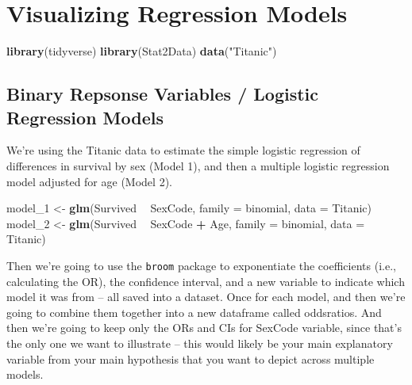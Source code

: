 \documentclass[]{article}
\newenvironment{Shaded}{\begin{snugshade}}{\end{snugshade}}
\newcommand{\DataTypeTok}[1]{\textcolor[rgb]{0.13,0.29,0.53}{#1}}
\newcommand{\DecValTok}[1]{\textcolor[rgb]{0.00,0.00,0.81}{#1}}
\newcommand{\KeywordTok}[1]{\textcolor[rgb]{0.13,0.29,0.53}{\textbf{#1}}}
\newcommand{\NormalTok}[1]{#1}
\newcommand{\OperatorTok}[1]{\textcolor[rgb]{0.81,0.36,0.00}{\textbf{#1}}}
\newcommand{\StringTok}[1]{\textcolor[rgb]{0.31,0.60,0.02}{#1}}
\begin{document}
\hypertarget{visualizing-regression-models}{%
\section{Visualizing Regression
Models}\label{visualizing-regression-models}}

\begin{Shaded}
\begin{Highlighting}[]
\KeywordTok{library}\NormalTok{(tidyverse)}
\KeywordTok{library}\NormalTok{(Stat2Data)}
\KeywordTok{data}\NormalTok{(}\StringTok{"Titanic"}\NormalTok{)}
\end{Highlighting}
\end{Shaded}

\hypertarget{binary-repsonse-variables-logistic-regression-models}{%
\subsection{Binary Repsonse Variables / Logistic Regression
Models}\label{binary-repsonse-variables-logistic-regression-models}}

We're using the Titanic data to estimate the simple logistic regression
of differences in survival by sex (Model 1), and then a multiple
logistic regression model adjusted for age (Model 2).

\begin{Shaded}
\begin{Highlighting}[]
\NormalTok{model_}\DecValTok{1}\NormalTok{ <-}\StringTok{ }\KeywordTok{glm}\NormalTok{(Survived }\OperatorTok{~}\StringTok{ }\NormalTok{SexCode, }\DataTypeTok{family =}\NormalTok{ binomial, }\DataTypeTok{data =}\NormalTok{ Titanic)}
\NormalTok{model_}\DecValTok{2}\NormalTok{ <-}\StringTok{ }\KeywordTok{glm}\NormalTok{(Survived }\OperatorTok{~}\StringTok{ }\NormalTok{SexCode }\OperatorTok{+}\StringTok{ }\NormalTok{Age, }\DataTypeTok{family =}\NormalTok{ binomial, }\DataTypeTok{data =}\NormalTok{ Titanic)}
\end{Highlighting}
\end{Shaded}

Then we're going to use the \texttt{broom} package to exponentiate the
coefficients (i.e., calculating the OR), the confidence interval, and a
new variable to indicate which model it was from -- all saved into a
dataset. Once for each model, and then we're going to combine them
together into a new dataframe called oddsratios. And then we're going to
keep only the ORs and CIs for SexCode variable, since that's the only
one we want to illustrate -- this would likely be your main explanatory
variable from your main hypothesis that you want to depict across
multiple models.
\end{document}
